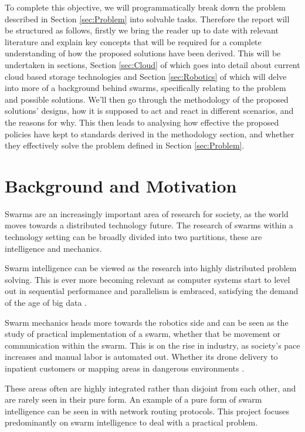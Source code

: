 \documentclass{UoYCSproject}
\begin{document}
To complete this objective, we will programmatically break down the problem described in Section \ref{sec:Problem} into solvable tasks.
Therefore the report will be structured as follows, firstly we bring the reader up to date with relevant literature and explain key concepts that will be required for a complete understanding of how the proposed solutions have been derived.
This will be undertaken in sections, Section \ref{sec:Cloud} of which goes into detail about current cloud based storage technologies and Section \ref{sec:Robotics} of which will delve into more of a background behind swarms, specifically relating to the problem and possible solutions.
We’ll then go through the methodology of the proposed solutions’ designs, how it is supposed to act and react in different scenarios, and the reasons for why.
This then leads to analysing how effective the proposed policies have kept to standards derived in the methodology section, and whether they effectively solve the problem defined in Section \ref{sec:Problem}.


\section{Background and Motivation}
\label{sec:Motivation}

Swarms are an increasingly important area of research for society, as the world moves towards a distributed technology future.
The research of swarms within a technology setting can be broadly divided into two partitions, these are intelligence and mechanics.

Swarm intelligence can be viewed as the research into highly distributed problem solving\cite{Cognitive maps mine detection, Swarm intellegiegence}.
This is ever more becoming relevant as computer systems start to level out in sequential performance \cite{CPU speed} and parallelism is embraced, satisfying the demand of the age of big data \cite{Avalability storage}.

Swarm mechanics heads more towards the robotics side and can be seen as the study of practical implementation of a swarm, whether that be movement or communication within the swarm.
This is on the rise in industry, as society's pace increases and manual labor is automated out. Whether its drone delivery to inpatient customers or mapping areas in dangerous environments \cite{Swarm robotics reviewed}.

These areas often are highly integrated rather than disjoint from each other, and are rarely seen in their pure form.
An example of a pure form of swarm intelligence can be seen in \cite{Swarm intellegiegence} with network routing protocols.
This project focuses predominantly on swarm intelligence to deal with a practical problem.
\end{document}
